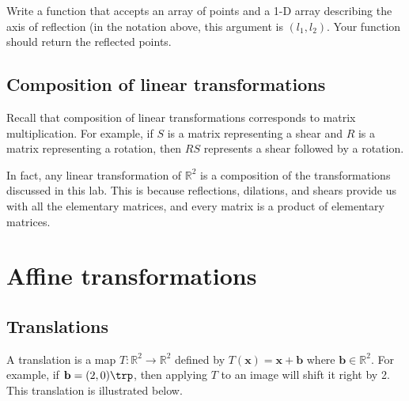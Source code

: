 \begin{problem}
Write a function that accepts an array of points and a 1-D array describing the axis of reflection (in the notation above, this argument is $(l_1, l_2)$.
Your function should return the reflected points.
\end{problem}

\subsection*{Composition of linear transformations}
Recall that composition of linear transformations corresponds to matrix multiplication.
For example, if $S$ is a matrix representing a shear and $R$ is a matrix representing a rotation, then $RS$ represents a shear followed by a rotation.

In fact, any linear transformation of $\mathbb{R}^2$ is a composition of the transformations discussed in this lab.
This is because reflections, dilations, and shears provide us with all the elementary matrices, and every matrix is a product of elementary matrices.


\section*{Affine transformations}
\subsection*{Translations}

A translation is a map $T: \mathbb{R}^2 \rightarrow \mathbb{R}^2$ defined by $T(\mathbf{x}) = \mathbf{x}+\mathbf{b}$ where $\mathbf{b} \in \mathbb{R}^2$.
For example, if $\mathbf{b} = (2, 0)\trp$, then applying $T$ to an image will shift it right by 2.
This translation is illustrated below.

